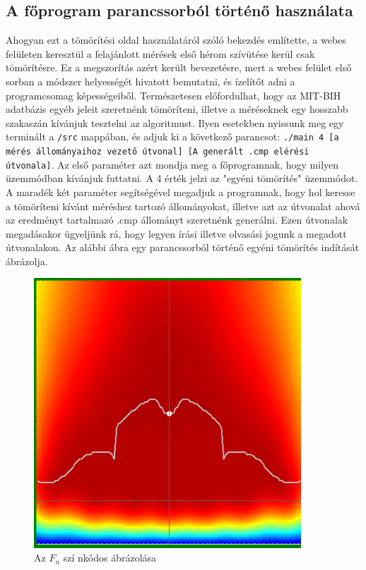 \documentclass[oneside,titlepage,12pt,a4paper]{report}
\begin{document}
\subsection*{A főprogram parancssorból történő használata} \label{sec:hosszu}

Ahogyan ezt a tömörítési oldal használatáról szóló bekezdés említette, a webes felületen keresztül a felajánlott mérések első hérom szívütése kerül csak tömörítésre. Ez a megszorítás azért került bevezetésre, mert a webes felület első sorban a módszer helyességét hivatott bemutatni, és ízelítőt adni a programcsomag képességeiből. Természetesen előfordulhat, hogy az MIT-BIH adatbázis egyéb jeleit szeretnénk tömöríteni, illetve a méréseknek egy hosszabb szakaszán kívánjuk tesztelni az algoritmust. Ilyen esetekben nyissunk meg egy terminált a \texttt{/src}  mappában, és adjuk ki a következő parancsot: \texttt{./main 4 [a mérés állományaihoz vezető útvonal] [A generált .cmp elérési útvonala]}. Az első paraméter azt mondja meg a főprogramnak, hogy milyen üzemmódban kívánjuk futtatni. A 4 érték jelzi az "egyéni tömörítés" üzemmódot. A maradék két paraméter segítségével megadjuk a programnak, hogy hol keresse a tömöríteni kívánt méréshez  tartozó állományokat, illetve azt az útvonalat ahová az eredményt tartalmazó .cmp állományt szeretnénk generálni. Ezen útvonalak megadásakor ügyeljünk rá, hogy legyen írási illetve olvasási jogunk a megadott útvonalakon. Az alábbi ábra egy parancssorból történő egyéni tömörítés indítását ábrázolja.

\begin{figure}[H]
\begin{center}
   \includegraphics[width=100mm]{./Abrak/Ereszkedo1/F_2sz.png}
  \caption{Az $F_n$ szí nkódos ábrázolása}
\end{center}
\end{figure}
\end{document}

